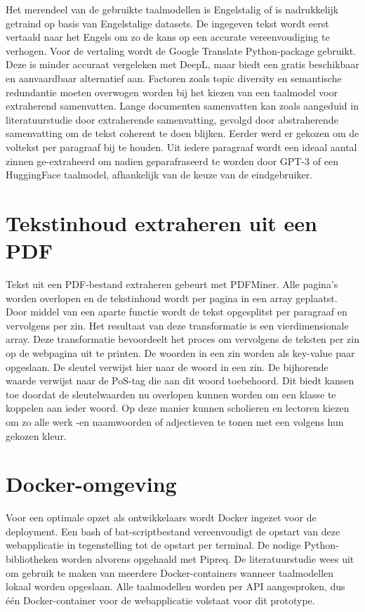Het merendeel van de gebruikte taalmodellen is Engelstalig of is nadrukkelijk getraind op basis van Engelstalige datasets. De ingegeven tekst wordt eerst vertaald naar het Engels om zo de kans op een accurate vereenvoudiging te verhogen. Voor de vertaling wordt de Google Translate Python-package gebruikt. Deze is minder accuraat vergeleken met DeepL, maar biedt een gratis beschikbaar en aanvaardbaar alternatief aan. Factoren zoals topic diversity en semantische redundantie moeten overwogen worden bij het kiezen van een taalmodel voor extraherend samenvatten. Lange documenten samenvatten kan zoals aangeduid in literatuurstudie door extraherende samenvatting, gevolgd door abstraherende samenvatting om de tekst coherent te doen blijken. Eerder werd er gekozen om de voltekst per paragraaf bij te houden. Uit iedere paragraaf wordt een ideaal aantal zinnen ge-extraheerd om nadien geparafraseerd te worden door GPT-3 of een HuggingFace taalmodel, afhankelijk van de keuze van de eindgebruiker.

\section{Tekstinhoud extraheren uit een PDF}

Tekst uit een PDF-bestand extraheren gebeurt met PDFMiner. Alle pagina's worden overlopen en de tekstinhoud wordt per pagina in een array geplaatst. Door middel van een aparte functie wordt de tekst opgesplitst per paragraaf en vervolgens per zin. Het resultaat van deze transformatie is een vierdimensionale array. Deze transformatie bevoordeelt het proces om vervolgens de teksten per zin op de webpagina uit te printen. De woorden in een zin worden als key-value paar opgeslaan. De sleutel verwijst hier naar de woord in een zin. De bijhorende waarde verwijst naar de PoS-tag die aan dit woord toebehoord. Dit biedt kansen toe doordat de sleutelwaarden nu overlopen kunnen worden om een klasse te koppelen aan ieder woord. Op deze manier kunnen scholieren en lectoren kiezen om zo alle werk -en naamwoorden of adjectieven te tonen met een volgens hun gekozen kleur.

\section{Docker-omgeving}

Voor een optimale opzet als ontwikkelaars wordt Docker ingezet voor de deployment. Een bash of bat-scriptbestand vereenvoudigt de opstart van deze webapplicatie in tegenstelling tot de opstart per terminal. De nodige Python-bibliotheken worden alvorens opgehaald met Pipreq. De literatuurstudie wees uit om gebruik te maken van meerdere Docker-containers wanneer taalmodellen lokaal worden opgeslaan. Alle taalmodellen worden per API aangesproken, dus één Docker-container voor de webapplicatie volstaat voor dit prototype.

